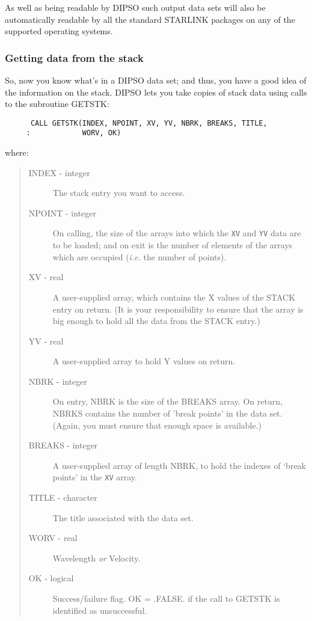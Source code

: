 \documentclass[twoside,11pt]{article}
\renewcommand{\_}{\texttt{\symbol{95}}}
\begin{document}
As well as being readable by DIPSO such output data sets will also be
automatically readable by all the standard STARLINK packages on any
of the supported operating systems.

\subsubsection {Getting data from the stack}

So, now you know what's in a DIPSO data set; and thus, you have a good
idea of the information on the stack. DIPSO lets you take copies of
stack data using calls to the subroutine GETSTK:

\begin{verbatim}
      CALL GETSTK(INDEX, NPOINT, XV, YV, NBRK, BREAKS, TITLE,
     :            WORV, OK)
\end{verbatim}

where:

\begin{quote}
\begin{description}

\item [INDEX - integer] The stack entry you want to access.

\item [NPOINT - integer] On calling, the size of the arrays into which the 
{\tt{XV}}  and {\tt{YV}}  data are to be loaded; and on exit is the
number of elements of the arrays which are occupied ({\em i.e.} the
number of points).

\item [XV - real] A user-supplied array, which contains the X values
of the STACK entry on return. (It is your responsibility to ensure
that the array is big enough to hold all the data from the STACK
entry.)

\item [YV - real] A user-supplied array to hold Y values on return.

\item [NBRK - integer] On entry, NBRK is the size of the BREAKS
array. On return, NBRKS contains the number of 'break points' in the
data set. (Again, you must ensure that enough space is available.)

\item [BREAKS - integer] A user-supplied array of length NBRK, to
hold the indexes of `break points' in the {\tt{XV}}  array.

\item [TITLE - character] The title associated with the data set.

\item [WORV - real] Wavelength {\em or} Velocity.

\item [OK - logical] Success/failure flag. OK = .FALSE. if the
call to GETSTK is identified as unsuccessful.

\end{description}
\end{quote}
\end{document}
